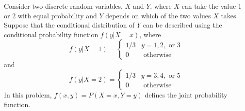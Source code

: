 \documentclass[addpoints]{examsetup}\usepackage[]{graphicx}\usepackage[]{color}
\begin{document}
\begin{questions}

\newpage

\question

Consider two discrete random variables, $X$ and $Y$, where $X$ can take the value 1 or 2 with equal probability and $Y$ depends on which of the two values $X$ takes.
Suppose that the conditional distribution of $Y$ can be described using the conditional probability function $f(y|X=x)$, where
$$
f(y|X = 1) = 
\begin{cases}
   1/3 & y = 1, 2, \text{ or } 3 \\
   0 &  \text{ otherwise }
\end{cases}
$$
and
$$
f(y|X = 2) = 
\begin{cases}
   1/3 & y = 3, 4, \text{ or } 5 \\
   0 &  \text{ otherwise }
\end{cases}
$$
In this problem, $f(x,y) = P(X = x, Y = y)$ defines the joint probability function.

\begin{parts}

\end{parts}
\end{questions}
\end{document}
